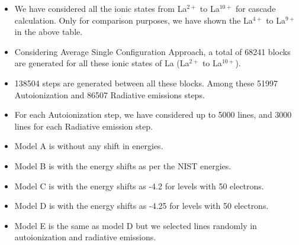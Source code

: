 \documentclass{article}
\begin{document}
\begin{itemize}
    \item We have considered all the ionic states from La$^{2+}$ to La$^{10+}$ for cascade calculation. Only for comparison purposes, we have shown the La$^{4+}$ to La$^{9+}$ in the above table.
    \item Considering Average Single Configuration Approach, a total of 68241 blocks are generated for all these ionic states of La (La$^{2+}$ to La$^{10+}$).
    \item 138504 steps are generated between all these blocks. Among these 51997 Autoionization and 86507 Radiative emissions steps.
    \item For each Autoionization step, we have considered up to 5000 lines, and 3000 lines for each Radiative emission step.
    \item Model A is without any shift in energies.
    \item Model B is with the energy shifts as per the NIST energies.
    \item Model C is with the energy shifts as -4.2 for levels with 50 electrons.
    \item Model D is with the energy shifts as -4.25 for levels with 50 electrons.
    \item Model E is the same as model D but we selected lines randomly in autoionization and radiative emissions.
\end{itemize}
\end{document}
